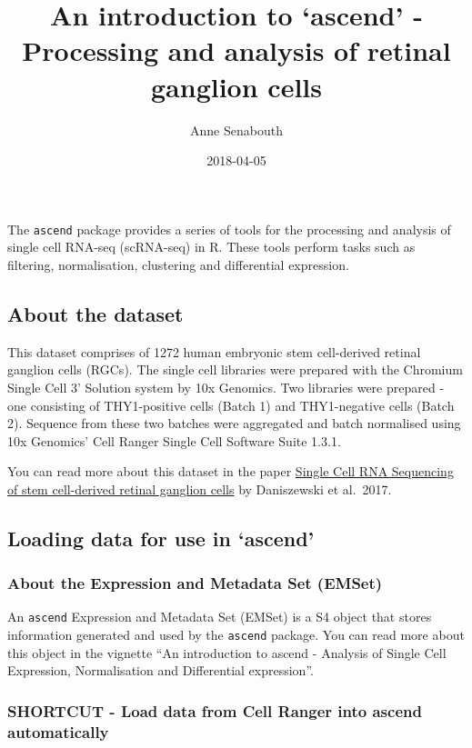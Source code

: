 \documentclass[]{article}
\title{An introduction to `ascend' - Processing and analysis of retinal
ganglion cells}
\author{Anne Senabouth}
\date{2018-04-05}
\begin{document}
\maketitle

The \texttt{ascend} package provides a series of tools for the
processing and analysis of single cell RNA-seq (scRNA-seq) in R. These
tools perform tasks such as filtering, normalisation, clustering and
differential expression.

\hypertarget{about-the-dataset}{%
\subsection{About the dataset}\label{about-the-dataset}}

This dataset comprises of 1272 human embryonic stem cell-derived retinal
ganglion cells (RGCs). The single cell libraries were prepared with the
Chromium Single Cell 3' Solution system by 10x Genomics. Two libraries
were prepared - one consisting of THY1-positive cells (Batch 1) and
THY1-negative cells (Batch 2). Sequence from these two batches were
aggregated and batch normalised using 10x Genomics' Cell Ranger Single
Cell Software Suite 1.3.1.

You can read more about this dataset in the paper
\href{https://www.biorxiv.org/content/early/2017/09/22/191395}{Single
Cell RNA Sequencing of stem cell-derived retinal ganglion cells} by
Daniszewski et al.~2017.

\hypertarget{loading-data-for-use-in-ascend}{%
\subsection{Loading data for use in
`ascend'}\label{loading-data-for-use-in-ascend}}

\hypertarget{about-the-expression-and-metadata-set-emset}{%
\subsubsection{About the Expression and Metadata Set
(EMSet)}\label{about-the-expression-and-metadata-set-emset}}

An \texttt{ascend} Expression and Metadata Set (EMSet) is a S4 object
that stores information generated and used by the \texttt{ascend}
package. You can read more about this object in the vignette ``An
introduction to ascend - Analysis of Single Cell Expression,
Normalisation and Differential expression''.

\hypertarget{shortcut---load-data-from-cell-ranger-into-ascend-automatically}{%
\subsubsection{SHORTCUT - Load data from Cell Ranger into ascend
automatically}\label{shortcut---load-data-from-cell-ranger-into-ascend-automatically}}
\end{document}

